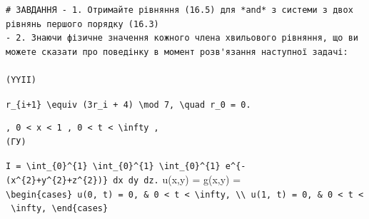 \documentclass[
  ukrainian,
]{article}
\begin{document}
\begin{verbatim}
# ЗАВДАННЯ - 1. Отримайте рівняння (16.5) для *and* з системи з двох рівнянь першого порядку (16.3)
- 2. Знаючи фізичне значення кожного члена хвильового рівняння, що ви можете сказати про поведінку в момент розв'язання наступної задачі:

(YYII)
\end{verbatim}

\texttt{r\_\{i+1\}\ \textbackslash{}equiv\ (3r\_i\ +\ 4)\ \textbackslash{}mod\ 7,\ \textbackslash{}quad\ r\_0\ =\ 0.}

\begin{verbatim}
, 0 < x < 1 , 0 < t < \infty ,  
(ГУ)
\end{verbatim}

\texttt{I\ =\ \textbackslash{}int\_\{0\}\^{}\{1\}\ \textbackslash{}int\_\{0\}\^{}\{1\}\ \textbackslash{}int\_\{0\}\^{}\{1\}\ e\^{}\{-(x\^{}\{2\}+y\^{}\{2\}+z\^{}\{2\})\}\ dx\ dy\ dz.}
u(x,y) = g(x,y) =
\texttt{\textbackslash{}begin\{cases\}\ u(0,\ t)\ =\ 0,\ \&\ 0\ \textless{}\ t\ \textless{}\ \textbackslash{}infty,\ \textbackslash{}\textbackslash{}\ u(1,\ t)\ =\ 0,\ \&\ 0\ \textless{}\ t\ \textless{}\ \textbackslash{}infty,\ \textbackslash{}end\{cases\}}
\end{document}
